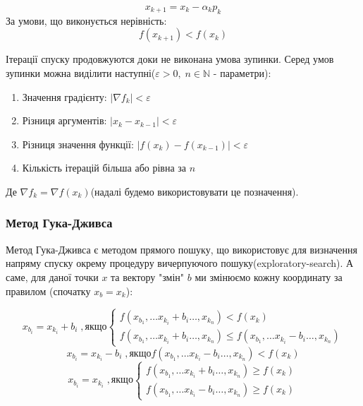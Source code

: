\begin{equation} \label{eq:descent}
    x_{k+1} = x_{k} - \alpha_k p_{k}
\end{equation}
За умови, що виконується нерівність:
\begin{equation} \label{eq:descent_require}
    f(x_{k+1}) < f(x_k)
\end{equation}

Ітерації спуску продовжуются доки не виконана умова зупинки.
Серед умов зупинки можна виділити наступні($\varepsilon > 0,\;
n \in \mathbb{N}$ - параметри):

\begin{enumerate}
    \item Значення градієнту: $|\nabla f_k| < \varepsilon$
    \item Різниця аргументів: $|x_k - x_{k-1}| < \varepsilon$
    \item Різниця значення функції: $|f(x_k) - f(x_{k-1})| < \varepsilon$
    \item Кількість ітерацій більша або рівна за $n$
\end{enumerate}
Де $ \nabla f_{k} = \nabla f(x_{k})$(надалі будемо
використовувати це позначення).

\subsubsection*{Метод Гука-Дживса}

Метод Гука-Дживса є методом прямого пошуку, що використовує
для визначення напряму спуску окрему процедуру вичерпуючого
пошуку(exploratory-search). А саме, для даної точки $x$ та
вектору "змін" $b$ ми змінюємо кожну координату за правилом
(спочатку $x_b = x_k$):

$$ x_{b_i} = x_{k_i} + b_i \;,\text{якщо}
    \begin{cases}
        f(x_{b_1}, \dots x_{k_i} + b_i \dots ,x_{k_n}) < f(x_k) \\
        f(x_{b_1}, \dots x_{k_i} + b_i \dots ,x_{k_n}) \leq f(x_{b_1}, \dots x_{k_i} - b_i \dots ,x_{k_n})
    \end{cases}
$$
$$ x_{b_i} = x_{k_i} - b_i \;,\text{якщо}
f(x_{b_1}, \dots x_{k_i} - b_i \dots ,x_{k_n}) < f(x_k)
$$
$$ x_{b_i} = x_{k_i} \;,\text{якщо}
\begin{cases}
    f(x_{b_1}, \dots x_{k_i} + b_i \dots ,x_{k_n}) \geq f(x_k) \\
    f(x_{b_1}, \dots x_{k_i} - b_i \dots ,x_{k_n}) \geq f(x_k)
\end{cases}
$$

